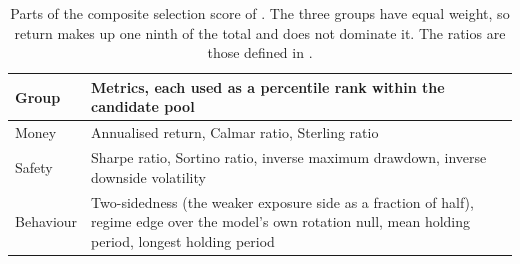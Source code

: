 \begin{table}[htb!]
\centering
\footnotesize
\caption{Parts of the composite selection score of . The three groups have equal weight, so return makes up one ninth of the total and does not dominate it. The ratios are those defined in .}
\label{Tables:Composite}
\begin{tabularx}{\textwidth}{@{}lX@{}}
\toprule
\textbf{Group} & \textbf{Metrics, each used as a percentile rank within the candidate pool} \\
\midrule
Money & Annualised return, Calmar ratio, Sterling ratio \\
\addlinespace
Safety & Sharpe ratio, Sortino ratio, inverse maximum drawdown, inverse downside volatility \\
\addlinespace
Behaviour & Two-sidedness (the weaker exposure side as a fraction of half), regime edge over the model's own rotation null, mean holding period, longest holding period \\
\bottomrule
\end{tabularx}
\end{table}